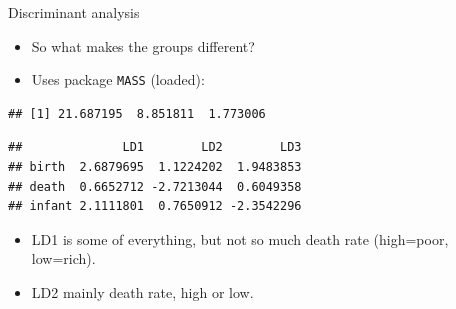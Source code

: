 \documentclass[ignorenonframetext,]{beamer}
\newenvironment{Shaded}{\begin{snugshade}}{\end{snugshade}}
\newcommand{\DataTypeTok}[1]{\textcolor[rgb]{0.13,0.29,0.53}{#1}}
\newcommand{\KeywordTok}[1]{\textcolor[rgb]{0.13,0.29,0.53}{\textbf{#1}}}
\newcommand{\NormalTok}[1]{#1}
\newcommand{\OperatorTok}[1]{\textcolor[rgb]{0.81,0.36,0.00}{\textbf{#1}}}
\newcommand{\StringTok}[1]{\textcolor[rgb]{0.31,0.60,0.02}{#1}}
\begin{document}
\begin{frame}[fragile]{Discriminant analysis}
\protect\hypertarget{discriminant-analysis-4}{}

\begin{itemize}
\item
  So what makes the groups different?
\item
  Uses package \texttt{MASS} (loaded):
\end{itemize}

\footnotesize

\begin{Shaded}
\end{Shaded}

\begin{verbatim}
## [1] 21.687195  8.851811  1.773006
\end{verbatim}

\begin{Shaded}
\end{Shaded}

\begin{verbatim}
##              LD1        LD2        LD3
## birth  2.6879695  1.1224202  1.9483853
## death  0.6652712 -2.7213044  0.6049358
## infant 2.1111801  0.7650912 -2.3542296
\end{verbatim}

\normalsize

\begin{itemize}
\item
  LD1 is some of everything, but not so much death rate (high=poor,
  low=rich).
\item
  LD2 mainly death rate, high or low.
\end{itemize}

\end{frame}
\end{document}
